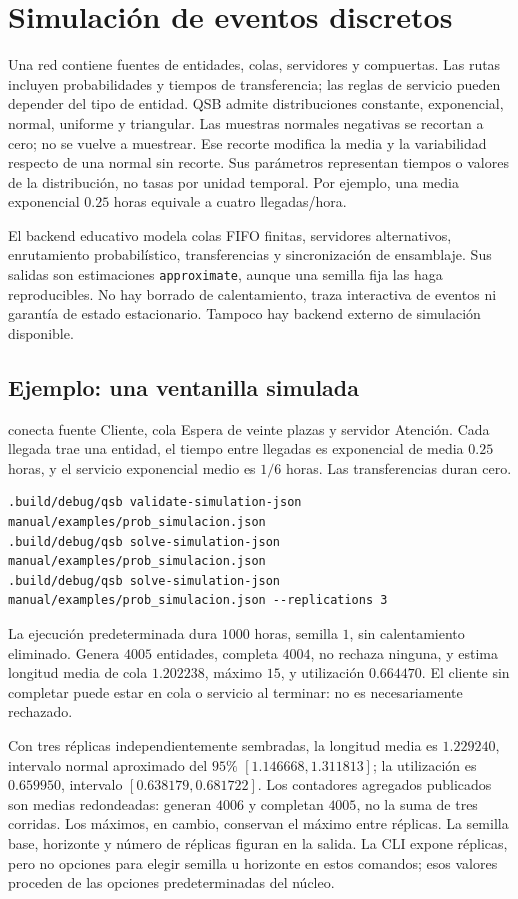 \section{Simulación de eventos discretos}
Una red contiene fuentes de entidades, colas, servidores y compuertas. Las rutas
incluyen probabilidades y tiempos de transferencia; las reglas de servicio pueden
depender del tipo de entidad. QSB admite distribuciones constante, exponencial,
normal, uniforme y triangular. Las muestras normales negativas se recortan
a cero; no se vuelve a muestrear. Ese recorte modifica la media y la
variabilidad respecto de una normal sin recorte. Sus parámetros representan tiempos o valores de
la distribución, no tasas por unidad temporal. Por ejemplo, una media
exponencial \(0.25\) horas equivale a cuatro llegadas/hora.

El backend educativo modela colas FIFO finitas, servidores alternativos,
enrutamiento probabilístico, transferencias y sincronización de ensamblaje.
Sus salidas son estimaciones \texttt{approximate}, aunque una semilla fija
las haga reproducibles. No hay borrado de calentamiento, traza interactiva de
eventos ni garantía de estado estacionario. Tampoco hay backend externo de
simulación disponible.

\subsection{Ejemplo: una ventanilla simulada}
 conecta fuente Cliente, cola Espera de veinte
plazas y servidor Atención. Cada llegada trae una entidad, el tiempo entre
llegadas es exponencial de media \(0.25\) horas, y el servicio exponencial
medio es \(1/6\) horas. Las transferencias duran cero.
\begin{lstlisting}
.build/debug/qsb validate-simulation-json manual/examples/prob_simulacion.json
.build/debug/qsb solve-simulation-json manual/examples/prob_simulacion.json
.build/debug/qsb solve-simulation-json manual/examples/prob_simulacion.json --replications 3
\end{lstlisting}
La ejecución predeterminada dura \(1000\) horas, semilla \(1\), sin
calentamiento eliminado. Genera \(4005\) entidades, completa \(4004\),
no rechaza ninguna, y estima longitud media de cola \(1.202238\), máximo
\(15\), y utilización \(0.664470\). El cliente sin completar puede estar
en cola o servicio al terminar: no es necesariamente rechazado.

Con tres réplicas independientemente sembradas, la longitud media es
\(1.229240\), intervalo normal aproximado del \(95\%\)
\([1.146668,1.311813]\); la utilización es \(0.659950\), intervalo
\([0.638179,0.681722]\). Los contadores agregados publicados son medias
redondeadas: generan \(4006\) y completan \(4005\), no la suma de tres
corridas. Los máximos, en cambio, conservan el máximo entre réplicas.
La semilla base, horizonte y número de réplicas figuran en la salida.
La CLI expone réplicas, pero no opciones para elegir semilla u horizonte en
estos comandos; esos valores proceden de las opciones predeterminadas del núcleo.

